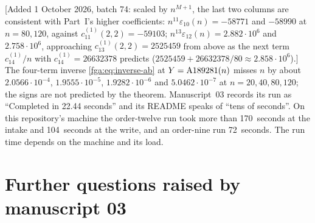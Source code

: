 \documentclass[11pt]{article}
\numberwithin{equation}{section}
\theoremstyle{definition}
\theoremstyle{remark}
\theoremstyle{definition}
\newcommand{\Aone}{\textnormal{A189281}}
\begin{document}
[Added 1 October 2026, batch 74: scaled by $n^{M+1}$, the last two columns
are consistent with Part~I's higher coefficients:
$n^{11}\varepsilon_{10}(n)=-58771$ and $-58990$ at $n=80,120$, against
$c_{11}^{(1)}(2,2)=-59103$; $n^{13}\varepsilon_{12}(n)=2.882\cdot10^6$ and
$2.758\cdot10^6$, approaching $c_{13}^{(1)}(2,2)=2525459$ from above as the
next term $c_{14}^{(1)}/n$ with $c_{14}^{(1)}=26632378$ predicts
($2525459+26632378/80\approx2.858\cdot10^6$).] The four-term inverse
\eqref{fga:eq:inverse-ab} at $Y=\Aone(n)$ misses $n$ by about
$2.0566\cdot10^{-4}$, $1.9555\cdot10^{-5}$, $1.9282\cdot10^{-6}$ and
$5.0462\cdot10^{-7}$ at $n=20,40,80,120$; the signs are not predicted by
the theorem. Manuscript~03 records its run as ``Completed in 22.44
seconds'' and its README speaks of ``tens of seconds''. On this
repository's machine the order-twelve run took more than 170~seconds at the
intake and 104~seconds at the write, and an order-nine run 72~seconds.
The run time depends on the machine and its load.

\section{Further questions raised by manuscript 03}
\label{fga:sec:questions}
\end{document}

